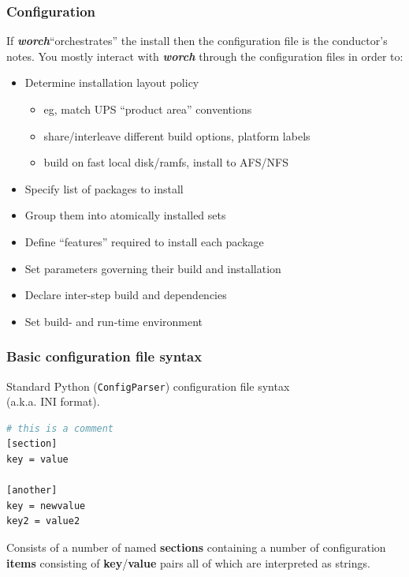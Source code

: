\documentclass[xcolor=dvipsnames]{beamer}
\newcommand{\app}[1]{\textbf{\textit{#1}}\xspace}
\def\worch{\app{worch}}
\begin{document}
\begin{frame}
  \frametitle{Configuration} 

  If \worch ``orchestrates'' the install then the configuration file
  is the conductor's notes.  You mostly interact with \worch through
  the configuration files in order to:
  \begin{itemize}
  \item Determine installation layout policy 
    \begin{itemize}
    \item eg, match UPS ``product area'' conventions
    \item share/interleave different build options, platform labels
    \item build on fast local disk/ramfs, install to AFS/NFS
    \end{itemize}
  \item Specify list of packages to install
  \item Group them into atomically installed sets
  \item Define ``features'' required to install each package
  \item Set parameters governing their build and installation
  \item Declare inter-step build and dependencies
  \item Set build- and run-time environment
  \end{itemize}
\end{frame}

\begin{frame}[fragile]
  \frametitle{Basic configuration file syntax}

  Standard Python (\texttt{ConfigParser}) configuration file syntax \\
  (a.k.a. INI format).

  \begin{lstlisting}[language=bash,emph={section,another}]
# this is a comment
[section]
key = value

[another]
key = newvalue
key2 = value2
  \end{lstlisting}

  Consists of a number of named \textbf{sections} containing a number
  of configuration \textbf{items} consisting of
  \textbf{key}/\textbf{value} pairs all of which are interpreted as strings.

\end{frame}
\end{document}

